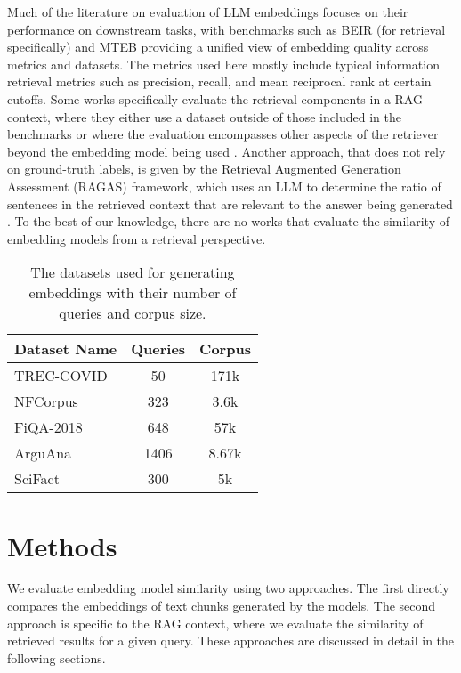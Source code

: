 \documentclass[nonacm,sigconf]{acmart}
\begin{document}
Much of the literature on evaluation of LLM embeddings focuses on their performance on downstream tasks, with benchmarks such as BEIR \cite{beir} (for retrieval specifically) and MTEB \cite{mteb} providing a unified view of embedding quality across metrics and datasets. The metrics used here mostly include typical information retrieval metrics such as precision, recall, and mean reciprocal rank at certain cutoffs. Some works specifically evaluate the retrieval components in a RAG context, where they either use a dataset outside of those included in the benchmarks \cite{rageval} or where the evaluation encompasses other aspects of the retriever beyond the embedding model being used \cite{rageval2}. Another approach, that does not rely on ground-truth labels, is given by the Retrieval Augmented Generation Assessment (RAGAS) framework, which uses an LLM to determine the ratio of sentences in the retrieved context that are relevant to the answer being generated \cite{ragas}. To the best of our knowledge, there are no works that evaluate the similarity of embedding models from a retrieval perspective.

\begin{table}[]
    \centering
    \caption{The datasets used for generating embeddings with their number of queries and corpus size.}
    \begin{tabular}{lcc}
        \toprule
        Dataset Name & Queries & Corpus \\
        \midrule
        TREC-COVID & 50 & 171k \\
        NFCorpus & 323 & 3.6k \\
        FiQA-2018 & 648 & 57k \\
        ArguAna & 1406 & 8.67k \\
        SciFact & 300 & 5k \\
        \bottomrule
    \end{tabular}
    \label{tab:datasets}
\end{table}

\section{Methods}

We evaluate embedding model similarity using two approaches. The first directly compares the embeddings of text chunks generated by the models. The second approach is specific to the RAG context, where we evaluate the similarity of retrieved results for a given query. These approaches are discussed in detail in the following sections.
\end{document}
